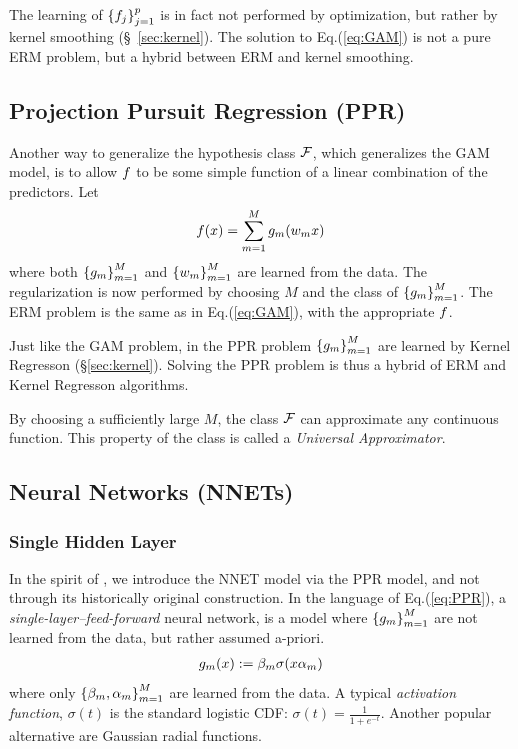 \begin{remark}
The learning of $\left\{ f_j \right\}_{j=1}^p$ is in fact not performed by optimization, but rather by kernel smoothing (\S~\ref{sec:kernel}).
The solution to Eq.(\ref{eq:GAM}) is not a pure ERM problem, but a hybrid between ERM and kernel smoothing.
\end{remark}



\subsection{Projection Pursuit Regression (PPR)}
\label{sec:ppr}
Another way to generalize the hypothesis class $\mathcal{F}$, which generalizes the GAM model, is to allow $f$ to be some simple function of a linear combination of the predictors. Let 
\begin{align}
\label{eq:PPR}
	f(x)=\sum_{m=1}^M g_m(w_m x)
\end{align}
where both $\left\{ g_m \right\}_{m=1}^M$ and $\left\{ w_m \right\}_{m=1}^M$ are learned from the data. 
The regularization is now performed by choosing $M$ and the class of $\left\{ g_m \right\}_{m=1}^M$.
The ERM problem is the same as in Eq.(\ref{eq:GAM}), with the appropriate $f$.

\begin{remark}
Just like the GAM problem, in the PPR problem $\left\{ g_m \right\}_{m=1}^M$ are learned by Kernel Regresson (\S\ref{sec:kernel}). Solving the PPR problem is thus a hybrid of ERM and Kernel Regresson algorithms.
\end{remark}

\begin{remark}
By choosing a sufficiently large $M$, the class $\mathcal{F}$ can approximate any continuous function. This property of the class is called a \emph{Universal Approximator}.
\end{remark}




\subsection{Neural Networks (NNETs)}
\subsubsection{Single Hidden Layer}
In the spirit of \cite[Section 11]{hastie_elements_2003}, we introduce the NNET model via the PPR model, and not through its historically original construction.
In the language of Eq.(\ref{eq:PPR}), a \emph{single-layer--feed-forward }neural network, is a model where $\left\{ g_m \right\}_{m=1}^M$  are not learned from the data, but rather assumed a-priori. 
\begin{align*}
	g_m(x):= \beta_m \sigma( x \alpha_m  )
\end{align*}
where only $\left\{ \beta_m, \alpha_m \right\}_{m=1}^M$ are learned from the data. 
A typical \emph{activation function}, $\sigma(t)$ is the standard logistic CDF: $\sigma(t)=\frac{1}{1+e^{-t}}$. Another popular alternative are Gaussian radial functions.

